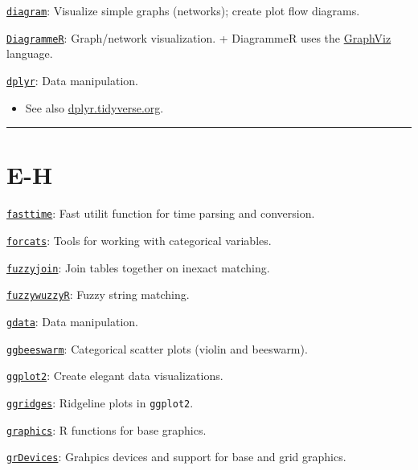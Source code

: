 \documentclass[
]{book}
\providecommand{\tightlist}{%
  \setlength{\itemsep}{0pt}\setlength{\parskip}{0pt}}
\begin{document}
\href{https://CRAN.R-project.org/package=diagram}{\texttt{diagram}}: Visualize simple graphs (networks); create plot flow diagrams.

\href{https://CRAN.R-project.org/package=DiagrammeR}{\texttt{DiagrammeR}}: Graph/network visualization.
+ DiagrammeR uses the \href{https://www.graphviz.org/}{GraphViz} language.

\href{https://CRAN.R-project.org/package=dplyr}{\texttt{dplyr}}: Data manipulation.

\begin{itemize}
\tightlist
\item
  See also \href{https://dplyr.tidyverse.org/}{dplyr.tidyverse.org}.
\end{itemize}

\begin{center}\rule{0.5\linewidth}{0.5pt}\end{center}

\hypertarget{e-h}{%
\section{E-H}\label{e-h}}

\href{https://CRAN.R-project.org/package=fasttime}{\texttt{fasttime}}: Fast utilit function for time parsing and conversion.

\href{https://CRAN.R-project.org/package=forcats}{\texttt{forcats}}: Tools for working with categorical variables.

\href{https://CRAN.R-project.org/package=fuzzyjoin}{\texttt{fuzzyjoin}}: Join tables together on inexact matching.

\href{https://CRAN.R-project.org/package=fuzzywuzzyR}{\texttt{fuzzywuzzyR}}: Fuzzy string matching.

\href{https://CRAN.R-project.org/package=gdata}{\texttt{gdata}}: Data manipulation.

\href{https://CRAN.R-project.org/package=ggbeeswarm}{\texttt{ggbeeswarm}}: Categorical scatter plots (violin and beeswarm).

\href{https://CRAN.R-project.org/package=ggplot2}{\texttt{ggplot2}}: Create elegant data visualizations.

\href{https://CRAN.R-project.org/package=ggridges}{\texttt{ggridges}}: Ridgeline plots in \texttt{ggplot2}.

\href{https://www.rdocumentation.org/packages/graphics/versions/3.5.1}{\texttt{graphics}}: R functions for base graphics.

\href{https://www.rdocumentation.org/packages/grDevices/versions/3.5.2}{\texttt{grDevices}}: Grahpics devices and support for base and grid graphics.
\end{document}
